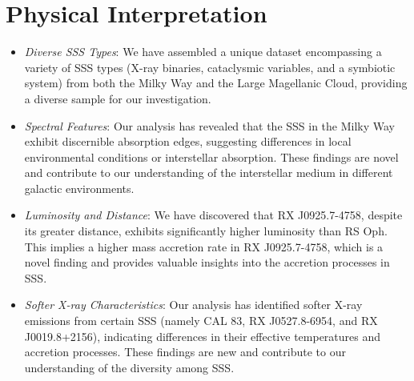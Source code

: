     \section{Physical Interpretation}
    \begin{itemize}
    	\item \textit{Diverse SSS Types}: We have assembled a unique dataset encompassing a variety of SSS types (X-ray binaries, cataclysmic variables, and a symbiotic system) from both the Milky Way and the Large Magellanic Cloud, providing a diverse sample for our investigation.
    	
    	\item \textit{Spectral Features}: Our analysis has revealed that the SSS in the Milky Way exhibit discernible absorption edges, suggesting differences in local environmental conditions or interstellar absorption. These findings are novel and contribute to our understanding of the interstellar medium in different galactic environments.
    	
    	\item \textit{Luminosity and Distance}: We have discovered that RX J0925.7-4758, despite its greater distance, exhibits significantly higher luminosity than RS Oph. This implies a higher mass accretion rate in RX J0925.7-4758, which is a novel finding and provides valuable insights into the accretion processes in SSS.
    	
    	\item \textit{Softer X-ray Characteristics}: Our analysis has identified softer X-ray emissions from certain SSS (namely CAL 83, RX J0527.8-6954, and RX J0019.8+2156), indicating differences in their effective temperatures and accretion processes. These findings are new and contribute to our understanding of the diversity among SSS.
    	

\end{itemize}
